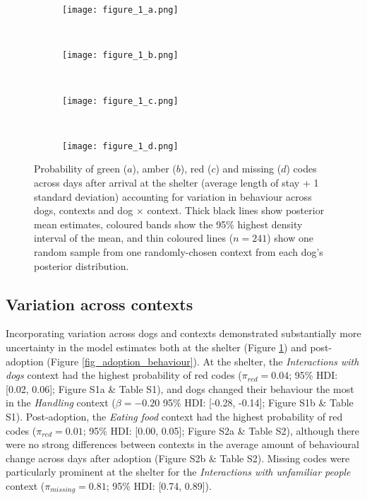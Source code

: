 \documentclass[12pt]{article}
\begin{document}
\begin{figure}[t!]
  \hspace{-2cm}%
  \begin{subfigure}{0.4\textwidth}
    \centering
    \texttt{[image: figure\_1\_a.png]}
  \end{subfigure}%
  ~%
  \hspace{-2cm}
  \begin{subfigure}{0.4\textwidth}
    \centering
    \texttt{[image: figure\_1\_b.png]}
  \end{subfigure}%
  ~%
  \hspace{-2cm}
  \begin{subfigure}{0.4\textwidth}
    \centering
    \texttt{[image: figure\_1\_c.png]}
  \end{subfigure}%
  ~%
  \hspace{-2cm}
  \begin{subfigure}{0.4\textwidth}
    \centering
    \texttt{[image: figure\_1\_d.png]}
  \end{subfigure}%

  \caption{Probability of green ($a$), amber ($b$), red ($c$) and missing ($d$) codes across days after arrival at the shelter (average length of stay + 1 standard deviation) accounting for variation in behaviour across dogs, contexts and dog $\times$ context. Thick black lines show posterior mean estimates, coloured bands show the 95\% highest density interval of the mean, and thin coloured lines ($n = 241$) show one random sample from one randomly-chosen context from each dog's posterior distribution.}
  \label{fig_shelter_behaviour}
\end{figure}

\subsection{Variation across contexts}
Incorporating variation across dogs and contexts demonstrated substantially more uncertainty in the model estimates both at the shelter (Figure \ref{fig_shelter_behaviour}) and post-adoption (Figure \ref{fig_adoption_behaviour}). At the shelter, the \textit{Interactions with dogs} context had the highest probability of red codes ($\pi_{red} = 0.04$; 95\% HDI: [0.02, 0.06]; Figure S1a \& Table S1), and dogs changed their behaviour the most in the \textit{Handling} context ($\beta = -0.20$ 95\% HDI: [-0.28, -0.14]; Figure S1b \& Table S1). Post-adoption, the \textit{Eating food} context had the highest probability of red codes ($\pi_{red} = 0.01$; 95\% HDI: [0.00, 0.05]; Figure S2a \& Table S2), although there were no strong differences between contexts in the average amount of behavioural change across days after adoption (Figure S2b \& Table S2). Missing codes were particularly prominent at the shelter for the \textit{Interactions with unfamiliar people} context ($\pi_{missing} = 0.81$; 95\% HDI: [0.74, 0.89]).
\end{document}
